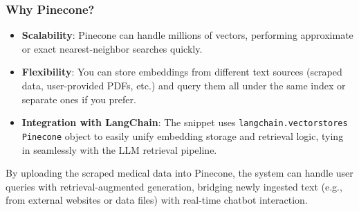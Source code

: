 \subsubsection*{Why Pinecone?}
\begin{itemize}
    \item \textbf{Scalability}:
    Pinecone can handle millions of vectors, performing approximate or exact nearest-neighbor searches quickly.  
    \item \textbf{Flexibility}:
    You can store embeddings from different text sources (scraped data, user-provided PDFs, etc.) and query them all under the same index or separate ones if you prefer.  
    \item \textbf{Integration with LangChain}:
    The snippet uses \texttt{langchain.vectorstores} \texttt{Pinecone} object to easily unify embedding storage and retrieval logic, tying in seamlessly with the LLM retrieval pipeline.
\end{itemize}

\noindent
By uploading the scraped medical data into Pinecone, the system can handle user queries with retrieval-augmented generation, bridging newly ingested text (e.g., from external websites or data files) with real-time chatbot interaction.

\clearpage
